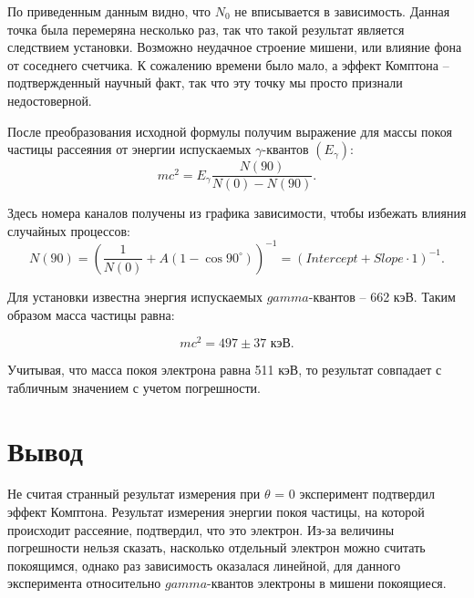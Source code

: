 \documentclass[a4paper, 14pt]{extarticle}%
\begin{document}
По приведенным данным видно, что $N_0$ не вписывается в зависимость. Данная точка была перемеряна несколько раз, так что такой результат является следствием установки. Возможно неудачное строение мишени, или влияние фона от соседнего счетчика. К сожалению времени было мало, а эффект Комптона -- подтвержденный научный факт, так что эту точку мы просто признали недостоверной.

После преобразования исходной формулы получим выражение для массы покоя частицы рассеяния от энергии испускаемых $\gamma$-квантов $(E_{\gamma})$:
\begin{equation}
mc^2 = E_{\gamma}\frac{N(90)}{N(0) - N(90)}.
\end{equation}

Здесь номера каналов получены из графика зависимости, чтобы избежать влияния случайных процессов:
\[N(90) = \left( \frac{1}{N(0)} + A(1-\cos 90^{\circ})\right)^{-1} = \left( Intercept + Slope\cdot 1 \right)^{-1}.     \]

Для установки известна энергия испускаемых $gamma$-квантов -- 662 кэВ. Таким образом масса частицы равна:

\[mc^2 = 497 \pm 37 \text{ кэВ.} \]

Учитывая, что масса покоя электрона равна 511 кэВ, то результат совпадает с табличным значением с учетом погрешности.
\newpage
\section*{Вывод}

Не считая странный результат измерения при $\theta$ = 0 эксперимент подтвердил эффект Комптона. Результат измерения энергии покоя частицы, на которой происходит рассеяние, подтвердил, что это электрон. Из-за величины погрешности нельзя сказать, насколько отдельный электрон можно считать покоящимся, однако раз зависимость оказалася линейной, для данного эксперимента относительно $gamma$-квантов электроны в мишени покоящиеся.
\end{document}
